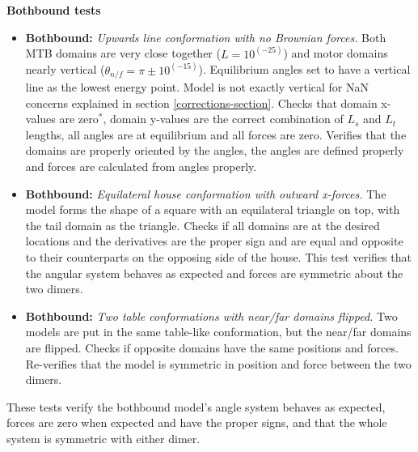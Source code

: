 \documentclass[
11pt, %
english, %
singlespacing, %
headsepline, %
chapterinoneline, %
]{MastersDoctoralThesis} %
\begin{document}
\textbf{Bothbound tests}
\begin{itemize}
\item \textbf{Bothbound:} \textit{Upwards line conformation with no Brownian forces.} Both MTB domains are very close together ($L=10^(-25)$) and motor domains nearly vertical ($\theta_{n/f} = \pi \pm 10^(-15)$). Equilibrium angles set to have a vertical line as the lowest energy point. Model is not exactly vertical for NaN concerns explained in section \ref{corrections-section}. Checks that domain x-values are zero$^*$, domain y-values are the correct combination of $L_s$ and $L_t$ lengths, all angles are at equilibrium and all forces are zero. Verifies that the domains are properly oriented by the angles, the angles are defined properly and forces are calculated from angles properly.
\item \textbf{Bothbound:} \textit{Equilateral house conformation with outward x-forces.} The model forms the shape of a square with an equilateral triangle on top, with the tail domain as the triangle. Checks if all domains are at the desired locations and the derivatives are the proper sign and are equal and opposite to their counterparts on the opposing side of the house. This test verifies that the angular system behaves as expected and forces are symmetric about the two dimers.
\item \textbf{Bothbound:} \textit{Two table conformations with near/far domains flipped.} Two models are put in the same table-like conformation, but the near/far domains are flipped. Checks if opposite domains have the same positions and forces. Re-verifies that the model is symmetric in position and force between the two dimers.
\end{itemize}

These tests verify the bothbound model's angle system behaves as expected, forces are zero when expected and have the proper signs, and that the whole system is symmetric with either dimer.


\printbibliography[heading=bibintoc]

\end{document}
